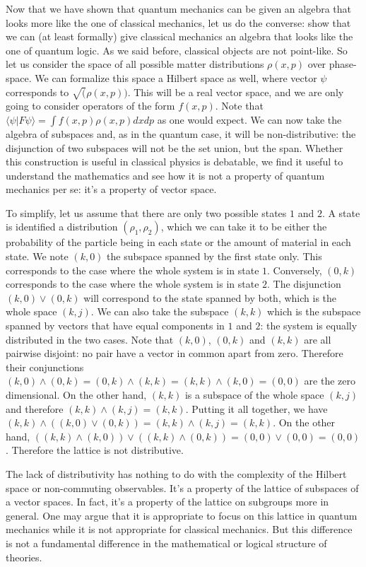 \documentclass[10pt,twocolumn, nofootinbib]{revtex4-1}
\begin{document}
Now that we have shown that quantum mechanics can be given an algebra that looks more like the one of classical mechanics, let us do the converse: show that we can (at least formally) give classical mechanics an algebra that looks like the one of quantum logic. As we said before, classical objects are not point-like. So let us consider the space of all possible matter distributions $\rho(x,p)$ over phase-space. We can formalize this space a Hilbert space as well, where vector $\psi$ corresponds to $\sqrt(\rho(x,p))$. This will be a real vector space, and we are only going to consider operators of the form $f(x,p)$. Note that $\langle \psi | F \psi \rangle = \int f(x,p) \rho(x,p) dx dp$ as one would expect. We can now take the algebra of subspaces and, as in the quantum case, it will be non-distributive: the disjunction of two subspaces will not be the set union, but the span. Whether this construction is useful in classical physics is debatable, we find it useful to understand the mathematics and see how it is not a property of quantum mechanics per se: it's a property of vector space.

To simplify, let us assume that there are only two possible states $1$ and $2$. A state is identified a distribution $(\rho_1, \rho_2)$, which we can take it to be either the probability of the particle being in each state or the amount of material in each state. We note $(k,0)$ the subspace spanned by the first state only. This corresponds to the case where the whole system is in state $1$. Conversely, $(0,k)$ corresponds to the case where the whole system is in state $2$. The disjunction $(k,0) \vee (0,k)$ will correspond to the state spanned by both, which is the whole space $(k,j)$. We can also take the subspace $(k,k)$ which is the subspace spanned by vectors that have equal components in $1$ and $2$: the system is equally distributed in the two cases. Note that $(k,0)$, $(0,k)$ and $(k,k)$ are all pairwise disjoint: no pair have a vector in common apart from zero. Therefore their conjunctions $(k,0) \wedge (0,k) = (0,k) \wedge (k,k) = (k,k) \wedge (k,0) = (0,0)$ are the zero dimensional. On the other hand, $(k,k)$ is a subspace of the whole space $(k,j)$ and therefore $(k,k) \wedge (k,j) = (k,k)$. Putting it all together, we have $(k,k) \wedge ( (k,0) \vee (0,k) ) = (k,k) \wedge (k,j) = (k,k)$. On the other hand, $( (k,k) \wedge (k,0) ) \vee ( (k,k) \wedge (0,k) ) = (0,0) \vee (0,0) = (0,0)$. Therefore the lattice is not distributive.

The lack of distributivity has nothing to do with the complexity of the Hilbert space or non-commuting observables. It's a property of the lattice of subspaces of a vector spaces. In fact, it's a property of the lattice on subgroups more in general. One may argue that it is appropriate to focus on this lattice in quantum mechanics while it is not appropriate for classical mechanics. But this difference is not a fundamental difference in the mathematical or logical structure of theories.
\end{document}
